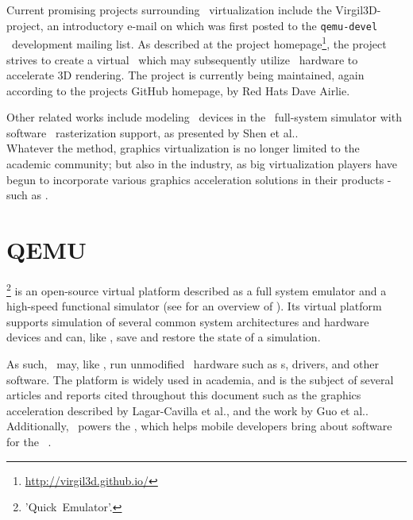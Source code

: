 Current promising projects surrounding \dvttermgpu\ virtualization include the Virgil3D-project, an introductory e-mail on which was first posted to the \texttt{qemu-devel} \dvttermqemu\ development mailing list.
As described at the project homepage\footnote{\url{http://virgil3d.github.io/}}, the project strives to create a virtual \dvttermgpu\ which may subsequently utilize \dvttermhost\ hardware to accelerate 3D rendering.
The project is currently being maintained, again according to the projects GitHub homepage, by Red Hats Dave Airlie.

Other related works include modeling \dvttermgpu\ devices in the \dvttermqemu\ full-system simulator with software \dvttermopengles\ rasterization support, as presented by Shen et al..\\

\noindent
Whatever the method, graphics virtualization is no longer limited to the academic community; but also in the industry, as big virtualization players have begun to incorporate various graphics acceleration solutions in their products - such as \dvttermvmware {}.

\section{QEMU}
\label{sec:relatedwork_qemu}
\dvttermqemu \footnote{'Quick~Emulator'.} is an open-source virtual platform described as a full system emulator and a high-speed functional simulator (see  for an overview of \dvttermqemu ).
Its virtual platform supports simulation of several common system architectures and hardware devices and can, like \dvttermsimics , save and restore the state of a simulation.

As such, \dvttermqemu\ may, like \dvttermsimics , run unmodified \dvttermtarget\ hardware such as \dvttermos s, drivers, and other software.
The platform is widely used in academia, and is the subject of several articles and reports cited throughout this document such as the graphics acceleration described by Lagar-Cavilla et al., and the work by Guo et al..
Additionally, \dvttermqemu\ powers the \dvttermandroidemulator , which helps mobile developers bring about software for the \dvttermandroid\ \dvttermos .

